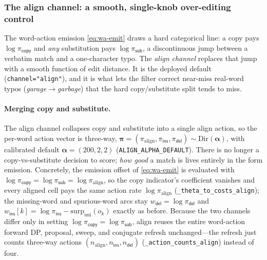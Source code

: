 \documentclass[11pt]{article}
\providecommand{\copyact}{\textsf{copy}}
\providecommand{\subact}{\textsf{sub}}
\providecommand{\insact}{\textsf{ins}}
\providecommand{\delact}{\textsf{del}}
\providecommand{\code}[1]{\texttt{#1}}
\providecommand{\wdel}{w_{\delact}}
\providecommand{\wins}{w_{\insact}}
\providecommand{\actdist}{\bm{\pi}}            %
\providecommand{\pcopy}{\pi_{\copyact}}
\providecommand{\psub}{\pi_{\subact}}
\providecommand{\pins}{\pi_{\insact}}
\providecommand{\pdel}{\pi_{\delact}}
\providecommand{\Dir}{\mathrm{Dir}}
\begin{document}
\subsubsection{The align channel: a smooth, single-knob over-editing control}
\label{sec:align}

The word-action emission \eqref{eq:wa-emit} draws a hard categorical line: a copy pays $\log\pcopy$ and \emph{any} substitution pays $\log\psub$, a discontinuous jump between a verbatim match and a one-character typo. The \emph{align channel} replaces that jump with a smooth function of edit distance. It is the deployed default (\code{channel="align"}), and it is what lets the filter correct near-miss real-word typos (\emph{garage}$\to$\emph{garbage}) that the hard copy/substitute split tends to miss.

\paragraph{Merging copy and substitute.} The align channel collapses copy and substitute into a single \textsf{align} action, so the per-word action vector is three-way, $\actdist = (\pi_{\mathrm{align}}, \pins, \pdel) \sim \Dir(\bm\alpha)$, with calibrated default $\bm\alpha = (200, 2, 2)$ (\code{ALIGN\_ALPHA\_DEFAULT}). There is no longer a copy-vs-substitute decision to score; \emph{how good} a match is lives entirely in the form emission. Concretely, the emission offset of \eqref{eq:wa-emit} is evaluated with $\log\pcopy = \log\psub = \log\pi_{\mathrm{align}}$, so the copy indicator's coefficient vanishes and every aligned cell pays the same action rate $\log\pi_{\mathrm{align}}$ (\code{\_theta\_to\_costs\_align}); the missing-word and spurious-word arcs stay $\wdel = \log\pdel$ and $\wins[k] = \log\pins - \mathrm{surp}_{\mathrm{uni}}(o_k)$ exactly as before. Because the two channels differ only in setting $\log\pcopy = \log\psub$, align reuses the entire word-action forward DP, proposal, sweep, and conjugate refresh unchanged---the refresh just counts three-way actions $(n_{\mathrm{align}}, n_{\insact}, n_{\delact})$ (\code{\_action\_counts\_align}) instead of four.
\end{document}
